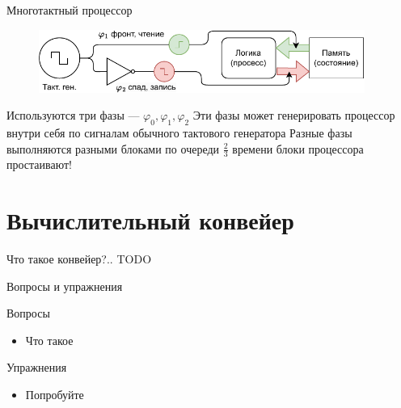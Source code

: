 \documentclass[xetex,aspectratio=43]{beamer}
\begin{document}
\begin{frame}{Многотактный процессор}
    \vspace{-2mm}
    \begin{figure}
        \includegraphics[width=0.95\textwidth, page=3]{img/11.CPUS.drawio-crop.pdf}
    \end{figure}
    \vspace{-2mm}

    \begin{outline}[itemize]
        \1 Используются три фазы --- $\varphi_0, \varphi_1, \varphi_2$
            \2 Эти фазы может генерировать процессор внутри себя по сигналам обычного тактового генератора
        \1 Разные фазы выполняются разными блоками по очереди
            \2 $\frac{2}{3}$ времени блоки процессора простаивают!
    \end{outline}
\end{frame}

\section{Вычислительный конвейер}

\begin{frame}{Что такое конвейер?..}
    \alert{TODO}
\end{frame}


\begin{frame}{Вопросы и упражнения}
\begin{block}{Вопросы}
\begin{itemize}
\tightlist
\item
  Что такое
\end{itemize}
\end{block}

\begin{block}{Упражнения}
\begin{itemize}
\tightlist
\item
  Попробуйте
\end{itemize}
\end{block}
\end{frame}

\postamble
\end{document}
